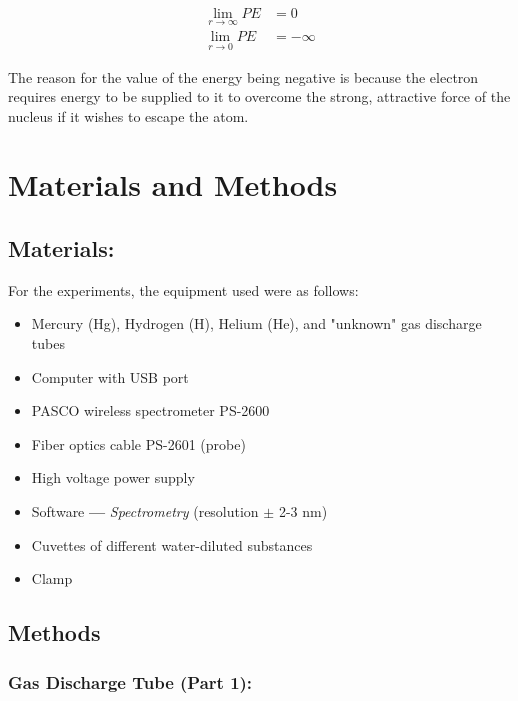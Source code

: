 \documentclass[10pt, letterpaper, twoside]{article}
\begin{document}
\begin{align*}
    \lim_{r\rightarrow\infty} PE &= 0\\
    \lim_{r\rightarrow 0}PE &= -\infty
\end{align*}

The reason for the value of the energy being negative is because the electron requires energy to be supplied to it to overcome the strong, attractive force of the nucleus if it wishes to escape the atom.

\vspace{-1em}

\section{Materials and Methods}

\subsection{Materials:}
\vspace{-1em}

For the experiments, the equipment used were as follows:

\vspace{-1em}

\begin{itemize}
    \item Mercury (Hg), Hydrogen (H), Helium (He), and "unknown" gas discharge tubes
    \item Computer with USB port
    \item PASCO wireless spectrometer PS-2600
    \item Fiber optics cable PS-2601 (probe)
    \item High voltage power supply
    \item Software \textbf{---} \textit{Spectrometry} (resolution $\pm$ 2-3 nm)
    \item Cuvettes of different water-diluted substances
    \item Clamp
\end{itemize}
\vspace{-2em}

\subsection{Methods}
\vspace{-1em}

\subsubsection{Gas Discharge Tube (Part 1):}
\end{document}
